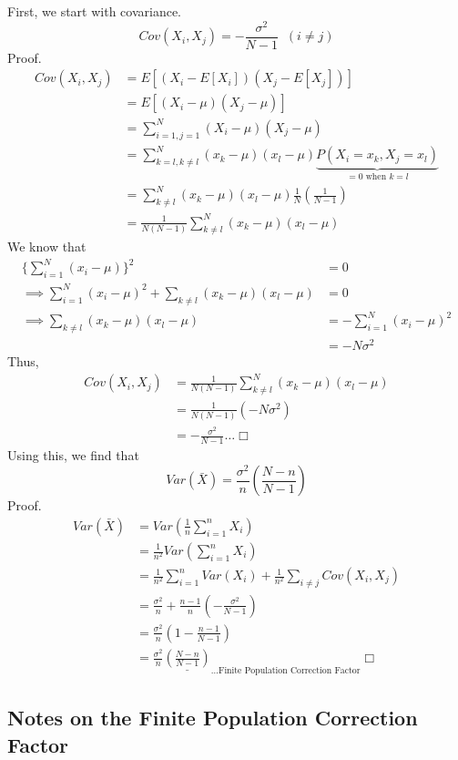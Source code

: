 \documentclass[
]{article}
\begin{document}
First, we start with covariance.
\[Cov(X_i, X_j) = -\frac{\sigma^2}{N-1}\;\;(i\ne j)\] Proof.
\[\begin{aligned}
Cov(X_i, X_j) &= E[(X_i - E[X_i])(X_j - E[X_j])] \\
&= E[(X_i - \mu)(X_j - \mu)] \\
&= \sum_{i=1, j=1}^{N}(X_i - \mu)(X_j - \mu) \\
&= \sum_{k = l, k \ne l}^{N}(x_k - \mu)(x_l - \mu)\underbrace{P(X_i = x_k, X_j = x_l)}_\text{\(=0\) when \(k = l\)} \\
&= \sum_{k \ne l}^{N}(x_k - \mu)(x_l - \mu)\frac{1}{N}(\frac{1}{N-1}) \\
&= \frac{1}{N(N-1)}\sum_{k \ne l}^{N}(x_k - \mu)(x_l - \mu) 
\end{aligned}\] We know that \[\begin{aligned}
\{\sum_{i=1}^N(x_i-\mu)\}^2 &= 0 \\
\implies \sum_{i=1}^{N}(x_i-\mu)^2 + \sum_{k\ne l}(x_k-\mu)(x_l-\mu)&= 0 \\
\implies \sum_{k\ne l}(x_k-\mu)(x_l-\mu) &= -  \sum_{i=1}^{N}(x_i-\mu)^2 \\
&= -N\sigma^2 
\end{aligned}\] Thus, \[\begin{aligned}
Cov(X_i, X_j)
&= \frac{1}{N(N-1)}\sum_{k \ne l}^{N}(x_k - \mu)(x_l - \mu) \\
&= \frac{1}{N(N-1)} (-N\sigma^2) \\
&= -\frac{\sigma^2}{N-1} \dots \Box
\end{aligned}\] Using this, we find that
\[Var(\bar{X}) = \frac{\sigma^2}{n}(\frac{N-n}{N-1})\] Proof.
\[\begin{aligned} 
Var(\bar{X}) &= Var(\frac{1}{n}\sum_{i=1}^n X_i) \\
&=\frac{1}{n^2}Var(\sum_{i=1}^n X_i) \\
&= \frac{1}{n^2}\sum_{i=1}^nVar(X_i) + \frac{1}{n^2}\sum_{i\ne j}Cov(X_i, X_j) \\
&= \frac{\sigma^2}{n} + \frac{n-1}{n}(-\frac{\sigma^2}{N-1})\\
&= \frac{\sigma^2}{n}(1 - \frac{n-1}{N-1})\\
&= \frac{\sigma^2}{n}\underline{(\frac{N-n}{N-1})}_{\dots\text{Finite Population Correction Factor}} \Box
\end{aligned}\]

\hypertarget{notes-on-the-finite-population-correction-factor}{%
\subsection{Notes on the Finite Population Correction
Factor}\label{notes-on-the-finite-population-correction-factor}}
\end{document}
